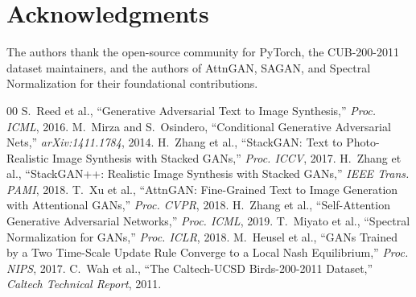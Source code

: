 \documentclass[conference]{IEEEtran}
\begin{document}
\section*{Acknowledgments}
The authors thank the open-source community for PyTorch, the CUB-200-2011 dataset maintainers, and the authors of AttnGAN, SAGAN, and Spectral Normalization for their foundational contributions.

\begin{thebibliography}{00}
 S.~Reed et al., ``Generative Adversarial Text to Image Synthesis,'' \emph{Proc. ICML}, 2016.
 M.~Mirza and S.~Osindero, ``Conditional Generative Adversarial Nets,'' \emph{arXiv:1411.1784}, 2014.
 H.~Zhang et al., ``StackGAN: Text to Photo-Realistic Image Synthesis with Stacked GANs,'' \emph{Proc. ICCV}, 2017.
 H.~Zhang et al., ``StackGAN++: Realistic Image Synthesis with Stacked GANs,'' \emph{IEEE Trans. PAMI}, 2018.
 T.~Xu et al., ``AttnGAN: Fine-Grained Text to Image Generation with Attentional GANs,'' \emph{Proc. CVPR}, 2018.
 H.~Zhang et al., ``Self-Attention Generative Adversarial Networks,'' \emph{Proc. ICML}, 2019.
 T.~Miyato et al., ``Spectral Normalization for GANs,'' \emph{Proc. ICLR}, 2018.
 M.~Heusel et al., ``GANs Trained by a Two Time-Scale Update Rule Converge to a Local Nash Equilibrium,'' \emph{Proc. NIPS}, 2017.
 C.~Wah et al., ``The Caltech-UCSD Birds-200-2011 Dataset,'' \emph{Caltech Technical Report}, 2011.
\end{thebibliography}
\end{document}
